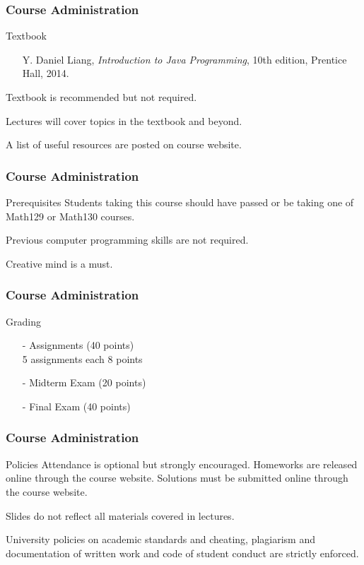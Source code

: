 \documentclass[10pt, compress]{beamer}
\begin{document}
\begin{frame}
	\frametitle{Course Administration}
	\begin{block}{Textbook}
		\begin{itemize}
			\item[] Y. Daniel Liang, \emph{Introduction to Java Programming}, 10th edition, Prentice Hall, 2014.
		\end{itemize}
		Textbook is recommended but not required.

		Lectures will cover topics in the textbook and beyond.

		A list of useful resources are posted on course website.
	\end{block}
\end{frame}

\begin{frame}
	\frametitle{Course Administration}
	\begin{block}{Prerequisites}
		Students taking this course should have passed or be taking one of Math129 or Math130 courses.

		Previous computer programming skills are not required.

		Creative mind is a must.
	\end{block}
\end{frame}

\begin{frame}
	\frametitle{Course Administration}
	\begin{block}{Grading}
		\begin{itemize}
			\item[-] Assignments (40 points)\\5 assignments each 8 points
			\item[-] Midterm Exam (20 points)
			\item[-] Final Exam (40 points)
		\end{itemize}
	\end{block}
\end{frame}

\begin{frame}
	\frametitle{Course Administration}
	\begin{block}{Policies}
		Attendance is optional but strongly encouraged. Homeworks are released online through the course website. Solutions must be submitted online through the course website.

		Slides do not reflect all materials covered in lectures.

		University policies on academic standards and cheating, plagiarism and documentation of written work and code of student conduct are strictly enforced.
	\end{block}
\end{frame}
\end{document}
